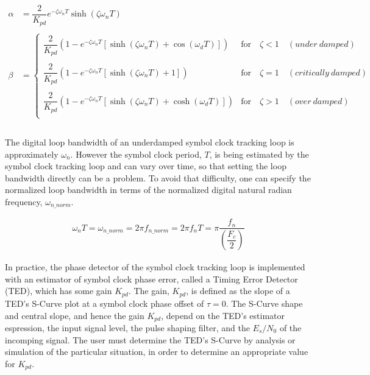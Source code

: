 \documentclass{article}
\begin{document}
\begin{align*}
   \alpha &= \dfrac{2}{K_{pd}}e^{-\zeta\omega_{n}T} \sinh(\zeta\omega_{n}T) \\
\\
   \beta  &=
      \begin{cases}
         \dfrac{2}{K_{pd}} \left(1 -
           e^{-\zeta\omega_{n}T} [\sinh(\zeta\omega_{n}T) + \cos(\omega_{d}T)]
          \right) &
         \text{for} \quad \zeta < 1 \quad (under \: damped)\\ \\
         \dfrac{2}{K_{pd}} \left(1 -
           e^{-\zeta\omega_{n}T} [\sinh(\zeta\omega_{n}T) + 1]
          \right) &
         \text{for} \quad \zeta = 1 \quad (critically \: damped)\\ \\
         \dfrac{2}{K_{pd}} \left(1 -
           e^{-\zeta\omega_{n}T} [\sinh(\zeta\omega_{n}T) +\cosh(\omega_{d}T)]
          \right) &
         \text{for} \quad \zeta > 1 \quad (over \: damped)\\
      \end{cases} \\
\\
\end{align*}

The digital loop bandwidth of an underdamped symbol clock tracking loop is
approximately $\omega_{n}$.  However the symbol clock period, $T$, is being
estimated by the symbol clock tracking loop and can vary over time, so that
setting the loop bandwidth directly can be a problem.  To avoid that difficulty,
one can specify the normalized loop bandwidth in terms of the normalized digital
natural radian frequency, $\omega_{n\_norm}$.

\begin{align*}
    \omega_{n}T = \omega_{n\_norm} = 2 \pi f_{n\_norm} = 2 \pi f_{n} T =
    \pi \dfrac{f_{n}}{\left(\dfrac{F_{c}}{2}\right)}
\end{align*}

In practice, the phase detector of the symbol clock tracking loop is implemented
with an estimator of symbol clock phase error, called a Timing Error Detector
(TED), which has some gain $K_{pd}$.  The gain, $K_{pd}$, is defined as the
slope of a TED's S-Curve plot at a symbol clock phase offset of $\tau = 0$.
The S-Curve shape and central slope, and hence the gain $K_{pd}$, depend on the
TED's estimator espression, the input signal level, the pulse shaping filter,
and the $E_s/N_0$ of the incomping signal.  The user must determine the TED's
S-Curve by analysis or simulation of the particular situation, in order to
determine an appropriate value for $K_{pd}$.
\end{document}
